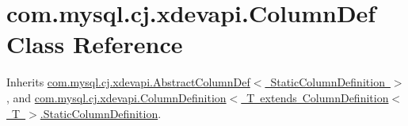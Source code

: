 \hypertarget{classcom_1_1mysql_1_1cj_1_1xdevapi_1_1_column_def}{}\section{com.\+mysql.\+cj.\+xdevapi.\+Column\+Def Class Reference}
\label{classcom_1_1mysql_1_1cj_1_1xdevapi_1_1_column_def}


Inherits \mbox{\hyperlink{classcom_1_1mysql_1_1cj_1_1xdevapi_1_1_abstract_column_def}{com.\+mysql.\+cj.\+xdevapi.\+Abstract\+Column\+Def$<$ Static\+Column\+Definition $>$}}, and \mbox{\hyperlink{interfacecom_1_1mysql_1_1cj_1_1xdevapi_1_1_column_definition_1_1_static_column_definition}{com.\+mysql.\+cj.\+xdevapi.\+Column\+Definition$<$ T extends Column\+Definition$<$ T $>$.\+Static\+Column\+Definition}}.

